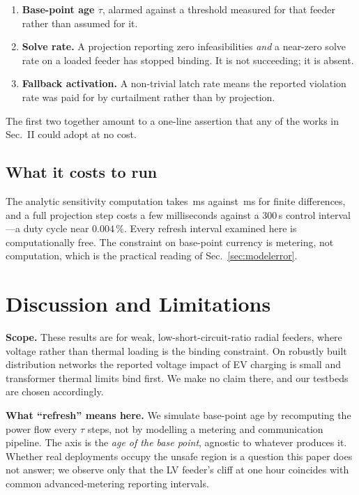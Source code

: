 \documentclass[conference,a4paper]{IEEEtran}
\begin{document}
\begin{enumerate}
\item \textbf{Base-point age $\tau$}, alarmed against a threshold measured for
      that feeder rather than assumed for it.
\item \textbf{Solve rate.} A projection reporting zero infeasibilities
      \emph{and} a near-zero solve rate on a loaded feeder has stopped binding.
      It is not succeeding; it is absent.
\item \textbf{Fallback activation.} A non-trivial latch rate means the reported
      violation rate was paid for by curtailment rather than by projection.
\end{enumerate}

The first two together amount to a one-line assertion that any of the works in
Sec.~II could adopt at no cost.

\subsection{What it costs to run}

The analytic sensitivity computation takes \nSensFast\,ms against \nSensSlow\,ms
for finite differences, and a full projection step costs a few milliseconds
against a 300\,s control interval---a duty cycle near $0.004\,\%$. Every refresh
interval examined here is computationally free. The constraint on base-point
currency is metering, not computation, which is the practical reading of
Sec.~\ref{sec:modelerror}.

\section{Discussion and Limitations}

\textbf{Scope.} These results are for weak, low-short-circuit-ratio radial
feeders, where voltage rather than thermal loading is the binding constraint. On
robustly built distribution networks the reported voltage impact of EV charging
is small and transformer thermal limits bind first. We make no claim there, and
our testbeds are chosen accordingly.

\textbf{What ``refresh'' means here.} We simulate base-point age by recomputing
the power flow every $\tau$ steps, not by modelling a metering and communication
pipeline. The axis is the \emph{age of the base point}, agnostic to whatever
produces it. Whether real deployments occupy the unsafe region is a question this
paper does not answer; we observe only that the LV feeder's cliff at one hour
coincides with common advanced-metering reporting intervals.
\end{document}
